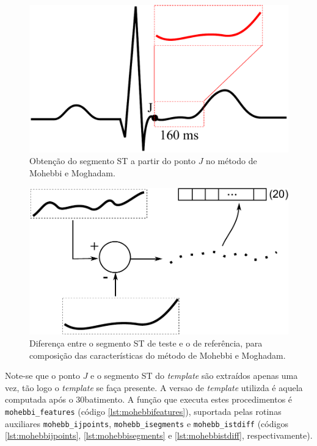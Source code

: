 \begin{figure}[ht]
    \centering
    \includegraphics[width=350pt]{figures/chap6-mohebbi-stseg.pdf}
    \caption[Obtenção do segmento ST a partir do ponto $J$]{Obtenção do segmento ST a partir do ponto $J$ no método de Mohebbi e Moghadam.}
    \label{fig:mohebbistseg}
\end{figure}

\begin{figure}[ht]
    \centering
    \includegraphics[width=350pt]{figures/chap6-mohebbi-stdiff.pdf}
    \caption[Diferença entre o segmento ST de teste e o de referência]{Diferença entre o segmento ST de teste e o de referência, para composição das características do método de Mohebbi e Moghadam.}
    \label{fig:mohebbistdiff}
\end{figure}

Note-se que o ponto $J$ e o segmento ST do \emph{template} são extraídos apenas uma vez, tão logo o \emph{template} se faça presente. A versao de \emph{template} utilizda é aquela computada após o 30\ordm batimento. A função que executa estes procedimentos é \texttt{mohebbi\_features} (código \ref{lst:mohebbifeatures}), suportada pelas rotinas auxiliares \texttt{mohebb\_ijpoints}, \texttt{mohebb\_isegments} e \texttt{mohebb\_istdiff} (códigos \ref{lst:mohebbijpoints}, \ref{lst:mohebbisegments} e \ref{lst:mohebbistdiff}, respectivamente).

